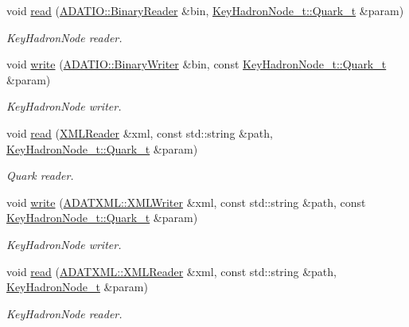\begin{DoxyCompactItemize}
void \mbox{\hyperlink{namespaceHadron_a60758467521910899dec197e7fbc0ab4}{read}} (\mbox{\hyperlink{classADATIO_1_1BinaryReader}{A\+D\+A\+T\+I\+O\+::\+Binary\+Reader}} \&bin, \mbox{\hyperlink{structHadron_1_1KeyHadronNode__t_1_1Quark__t}{Key\+Hadron\+Node\+\_\+t\+::\+Quark\+\_\+t}} \&param)
\begin{DoxyCompactList}\small\item\em Key\+Hadron\+Node reader. \end{DoxyCompactList}\item 
void \mbox{\hyperlink{namespaceHadron_ae47780c59de1d15679cc11611947b313}{write}} (\mbox{\hyperlink{classADATIO_1_1BinaryWriter}{A\+D\+A\+T\+I\+O\+::\+Binary\+Writer}} \&bin, const \mbox{\hyperlink{structHadron_1_1KeyHadronNode__t_1_1Quark__t}{Key\+Hadron\+Node\+\_\+t\+::\+Quark\+\_\+t}} \&param)
\begin{DoxyCompactList}\small\item\em Key\+Hadron\+Node writer. \end{DoxyCompactList}\item 
void \mbox{\hyperlink{namespaceHadron_a6eef93fdb3fe356c6326b6e8e0757ccb}{read}} (\mbox{\hyperlink{classADATXML_1_1XMLReader}{X\+M\+L\+Reader}} \&xml, const std\+::string \&path, \mbox{\hyperlink{structHadron_1_1KeyHadronNode__t_1_1Quark__t}{Key\+Hadron\+Node\+\_\+t\+::\+Quark\+\_\+t}} \&param)
\begin{DoxyCompactList}\small\item\em Quark reader. \end{DoxyCompactList}\item 
void \mbox{\hyperlink{namespaceHadron_aa7f9575393c93afa7db5f164da5c31eb}{write}} (\mbox{\hyperlink{classADATXML_1_1XMLWriter}{A\+D\+A\+T\+X\+M\+L\+::\+X\+M\+L\+Writer}} \&xml, const std\+::string \&path, const \mbox{\hyperlink{structHadron_1_1KeyHadronNode__t_1_1Quark__t}{Key\+Hadron\+Node\+\_\+t\+::\+Quark\+\_\+t}} \&param)
\begin{DoxyCompactList}\small\item\em Key\+Hadron\+Node writer. \end{DoxyCompactList}\item 
void \mbox{\hyperlink{namespaceHadron_acbb0293cc9773c6009050757b471c4d8}{read}} (\mbox{\hyperlink{classADATXML_1_1XMLReader}{A\+D\+A\+T\+X\+M\+L\+::\+X\+M\+L\+Reader}} \&xml, const std\+::string \&path, \mbox{\hyperlink{structHadron_1_1KeyHadronNode__t}{Key\+Hadron\+Node\+\_\+t}} \&param)
\begin{DoxyCompactList}\small\item\em Key\+Hadron\+Node reader. \end{DoxyCompactList}\item 

\end{DoxyCompactItemize}
